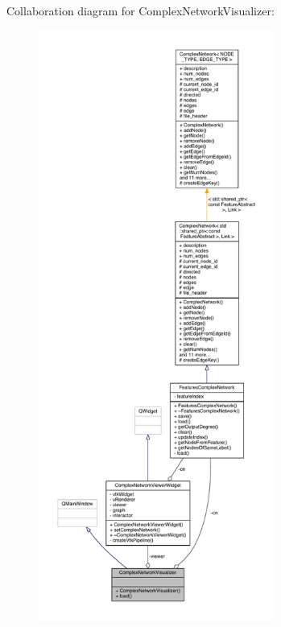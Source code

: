 Collaboration diagram for Complex\+Network\+Visualizer\+:\nopagebreak
\begin{figure}[H]
\begin{center}
\leavevmode
\includegraphics[height=550pt]{class_complex_network_visualizer__coll__graph}
\end{center}
\end{figure}


